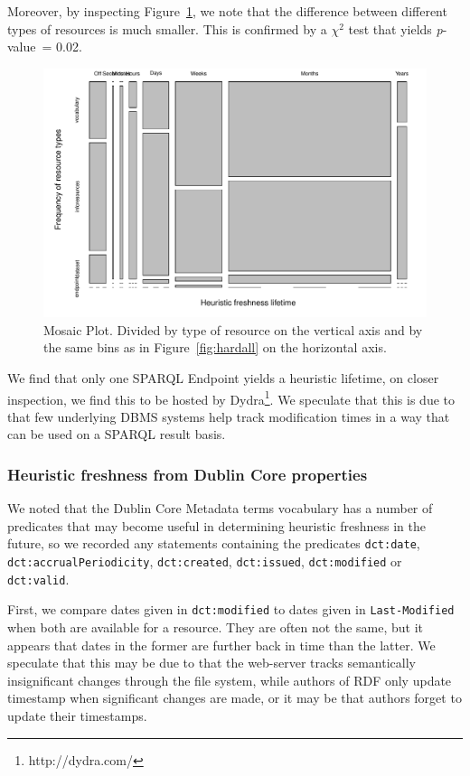 \documentclass{llncs}
\newcommand{\rdfterm}[1]{\texttt{#1}}
\newcommand{\pvalue}{\textit{p}-value\ }
\newcommand{\httph}[1]{\texttt{#1}}
\begin{document}
Moreover, by inspecting Figure~\ref{fig:heuristictable}, we
note that the difference between different types of resources is much
smaller. This is confirmed by a $\chi^2$ test that yields \pvalue =
0.02.

\begin{figure}[hb!]
  \centerline{%
    \includegraphics[width=.9\textwidth]{heuristictable.pdf}}
  \caption{Mosaic Plot. Divided by type of resource on the vertical
    axis and by the same bins as in Figure~\ref{fig:hardall} on the
    horizontal axis. }
  \label{fig:heuristictable}
\end{figure}


We find that only one SPARQL Endpoint yields a heuristic lifetime, on
closer inspection, we find this to be hosted by
Dydra\footnote{http://dydra.com/}. We speculate that this is due to
that few underlying DBMS systems help track modification times in a
way that can be used on a SPARQL result basis.

\subsubsection{Heuristic freshness from Dublin Core properties}

We noted that the Dublin Core Metadata terms vocabulary has a number
of predicates that may become useful in determining heuristic
freshness in the future, so we recorded any statements containing the
predicates \rdfterm{dct:date}, \rdfterm{dct:accrualPeriodicity},
\rdfterm{dct:created}, \rdfterm{dct:issued}, \rdfterm{dct:modified} or
\rdfterm{dct:valid}.

First, we compare dates given in \rdfterm{dct:modified} to dates given
in \httph{Last-Modified} when both are available for a resource. They
are often not the same, but it appears that dates in the former are
further back in time than the latter. We speculate that this may be
due to that the web-server tracks semantically insignificant changes
through the file system, while authors of RDF only update timestamp
when significant changes are made, or it may be that authors forget to
update their timestamps.
\end{document}
